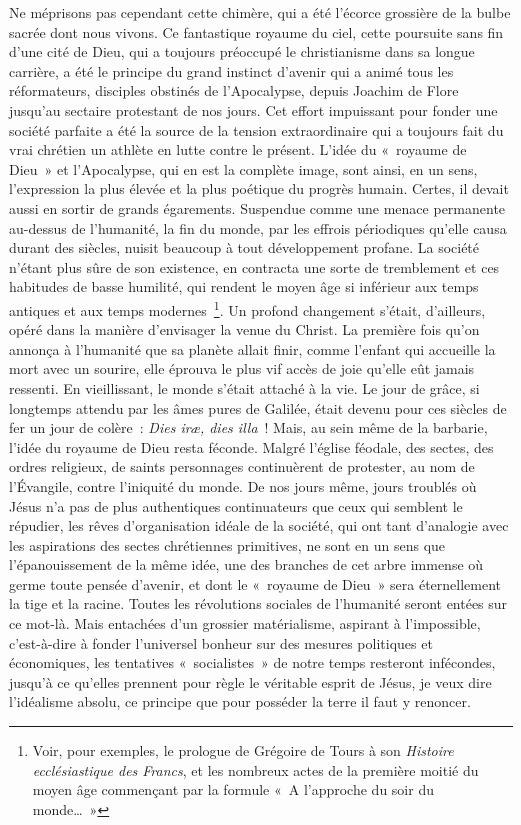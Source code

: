 \documentclass[french,twoside]{book} %
\begin{document}
Ne méprisons pas cependant cette chimère, qui a été l’écorce grossière de la bulbe sacrée dont nous vivons. Ce fantastique royaume du ciel, cette poursuite sans fin d’une cité de Dieu, qui a toujours préoccupé le christianisme dans sa longue carrière, a été le principe du grand instinct d’avenir qui a animé tous les réformateurs, disciples obstinés de l’Apocalypse, depuis Joachim de Flore jusqu’au sectaire protestant de nos jours. Cet effort impuissant pour fonder une société parfaite a été la source de la tension extraordinaire qui a toujours fait du vrai chrétien un athlète en lutte contre le présent. L’idée du « royaume de Dieu » et l’Apocalypse, qui en est la complète image, sont ainsi, en un sens, l’expression la plus élevée et la plus poétique du progrès humain. Certes, il devait aussi en sortir de grands égarements. Suspendue comme une menace permanente au-dessus de l’humanité, la fin du monde, par les effrois périodiques qu’elle causa durant des siècles, nuisit beaucoup à tout développement profane. La société n’étant plus sûre de son existence, en contracta une sorte de tremblement et ces habitudes de basse humilité, qui rendent le moyen âge si inférieur aux temps antiques et aux temps modernes \footnote{ Voir, pour exemples, le prologue de Grégoire de Tours à son {\itshape Histoire ecclésiastique des Francs}, et les nombreux actes de la première moitié du moyen âge commençant par la formule « A l’approche du soir du monde… »}. Un profond changement s’était, d’ailleurs, opéré dans la manière d’envisager la venue du Christ. La première fois qu’on annonça à l’humanité que sa planète allait finir, comme l’enfant qui accueille la mort avec un sourire, elle éprouva le plus vif accès de joie qu’elle eût jamais ressenti. En vieillissant, le monde s’était attaché à la vie. Le jour de grâce, si longtemps attendu par les âmes pures de Galilée, était devenu pour ces siècles de fer un jour de colère : {\itshape Dies iræ, dies illa} ! Mais, au sein même de la barbarie, l’idée du royaume de Dieu resta féconde. Malgré l’église féodale, des sectes, des ordres religieux, de saints personnages continuèrent de protester, au nom de l’Évangile, contre l’iniquité du monde. De nos jours même, jours troublés où Jésus n’a pas de plus authentiques continuateurs que ceux qui semblent le répudier, les rêves d’organisation idéale de la société, qui ont tant d’analogie avec les aspirations des sectes chrétiennes primitives, ne sont en un sens que l’épanouissement de la même idée, une des branches de cet arbre immense où germe toute pensée d’avenir, et dont le « royaume de Dieu » sera éternellement la tige et la racine. Toutes les révolutions sociales de l’humanité seront entées sur ce mot-là. Mais entachées d’un grossier matérialisme, aspirant à l’impossible, c’est-à-dire à fonder l’universel bonheur sur des mesures politiques et économiques, les tentatives « socialistes » de notre temps resteront infécondes, jusqu’à ce qu’elles prennent pour règle le véritable esprit de Jésus, je veux dire l’idéalisme absolu, ce principe que pour posséder la terre il faut y renoncer.\par
\end{document}
